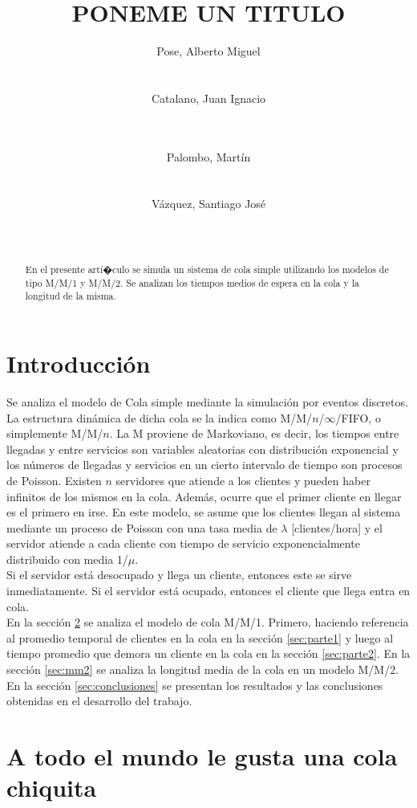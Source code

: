 \documentclass{sig-alternate}
\title{PONEME UN TITULO}
\author{
\alignauthor
Pose, Alberto Miguel\\
       \affaddr{Instituto Tecnol\'ogico de Buenos Aires}\\
       \affaddr{Buenos Aires, Argentina}\\
       \email{apose@alu.itba.edu.ar}
\alignauthor
Catalano, Juan Ignacio\\
       \affaddr{Instituto Tecnol\'ogico de Buenos Aires}\\
       \affaddr{Buenos Aires, Argentina}\\
       \email{jcatalan@alu.itba.edu.ar}
\and
\alignauthor 
Palombo, Mart\'in\\
       \affaddr{Instituto Tecnol\'ogico de Buenos Aires}\\
       \affaddr{Buenos Aires, Argentina}\\
       \email{mpalombo@alu.itba.edu.ar}
\alignauthor 
V\'azquez, Santiago Jos\'e\\
       \affaddr{Instituto Tecnol\'ogico de Buenos Aires}\\
       \affaddr{Buenos Aires, Argentina}\\
       \email{savazque@alu.itba.edu.ar}
}
\date{}
\begin{document}
\maketitle

\begin{abstract}

En el presente art\'i�culo se simula un sistema de cola simple utilizando los modelos de tipo M/M/1 y M/M/2.
Se analizan los tiempos medios de espera en la cola y la longitud de la misma.
\end{abstract}

\newpage

\section{Introducci\'on}

Se analiza el modelo de Cola simple mediante la simulaci\'on por eventos discretos.
La estructura din\'amica de dicha cola se la indica como M/M/$n$/$\infty$/FIFO, o simplemente M/M/$n$.
La M proviene de Markoviano, es decir, los tiempos entre llegadas y entre servicios son variables
aleatorias con distribuci\'on exponencial y los n\'umeros de llegadas y servicios en un cierto
intervalo de tiempo son procesos de Poisson.  Existen $n$ servidores que atiende a los clientes
y pueden haber infinitos de los mismos en la cola. Adem\'as, ocurre que el primer cliente en llegar es el primero en irse.
En este modelo, se asume que los clientes llegan al sistema mediante un proceso de Poisson con una tasa
media de $\lambda$ [clientes/hora] y el servidor atiende a cada cliente con tiempo de servicio exponencialmente
distribuido con media 1/$\mu$. \\
Si el servidor est\'a desocupado y llega un cliente, entonces este se sirve inmediatamente. Si el servidor est\'a
ocupado, entonces el cliente que llega entra en cola. \\
En la secci\'on \ref{sec:mm1} se analiza el modelo de cola M/M/1. Primero, haciendo referencia al
promedio temporal de clientes en la cola en la secci\'on \ref{sec:parte1} y luego
al tiempo promedio que demora un cliente en la cola en la secci\'on \ref{sec:parte2}.
En la secci\'on \ref{sec:mm2} se analiza la longitud media de la cola en un modelo M/M/2.
En la secci\'on \ref{sec:conclusiones} se presentan los resultados y las conclusiones obtenidas en el desarrollo del trabajo.
\section{A todo el mundo le gusta una cola chiquita}
\label{sec:mm1}
\end{document}
